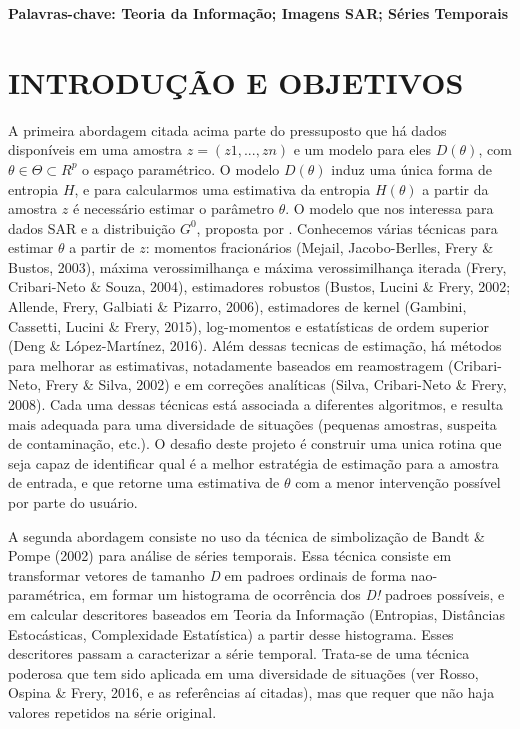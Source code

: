 \documentclass[12pt,letterpaper]{article}
\begin{document}
\textbf{Palavras-chave: Teoria da Informação; Imagens SAR; Séries Temporais} 
  
  \newpage
\section*{\centering \textbf{INTRODUÇÃO E OBJETIVOS}} %

A primeira abordagem citada acima parte do pressuposto que há dados disponíveis em uma amostra $z = (z1, . . . , zn)$ e um modelo para eles $D(\theta)$, com $\theta \in \Theta \subset R ^ p$ o espaço paramétrico. O modelo $D(\theta)$ induz uma única forma de entropia $H$, e para calcularmos uma estimativa da entropia $H(\theta)$ a partir da amostra $z$ é necessário estimar o parâmetro $\theta$. O modelo que nos interessa para dados SAR e a distribuição $G^0$, proposta por \cite{FreryMullerYanasse1997}. Conhecemos várias técnicas para estimar $\theta$ a partir de $z$: momentos fracionários (Mejail, Jacobo-Berlles, Frery \& Bustos, 2003), máxima verossimilhança e máxima verossimilhança iterada (Frery, Cribari-Neto \& Souza, 2004), estimadores robustos (Bustos, Lucini \& Frery, 2002; Allende, Frery, Galbiati \& Pizarro, 2006), estimadores de kernel (Gambini, Cassetti, Lucini \& Frery, 2015), log-momentos e estatísticas de ordem superior (Deng \& López-Martínez, 2016). Além dessas tecnicas de estimação, há métodos para melhorar as estimativas, notadamente baseados em reamostragem (Cribari-Neto, Frery \& Silva, 2002) e em correções analíticas (Silva, Cribari-Neto \& Frery, 2008). Cada uma dessas técnicas está associada a diferentes algoritmos, e resulta mais adequada para uma diversidade de situações (pequenas amostras, suspeita de contaminação, etc.). O desafio deste projeto é construir uma unica rotina que seja capaz de identificar qual é a melhor estratégia de estimação para a amostra de entrada, e que retorne uma estimativa de $\theta$ com a menor intervenção possível por parte do usuário.

A segunda abordagem consiste no uso da técnica de simbolização de Bandt \& Pompe (2002) para análise de séries temporais. Essa técnica consiste em transformar vetores de tamanho \textit{D} em padroes ordinais de forma nao-paramétrica, em formar um histograma de ocorrência dos \textit{D!} padroes possíveis, e em calcular descritores baseados em Teoria da Informação (Entropias, Distâncias Estocásticas, Complexidade Estatística) a partir desse histograma. Esses descritores passam a caracterizar a série temporal. Trata-se de uma técnica poderosa que tem sido aplicada em uma diversidade de situações (ver Rosso, Ospina \& Frery, 2016, e as referências aí citadas), mas que requer que não haja valores repetidos na série original.
\end{document}
